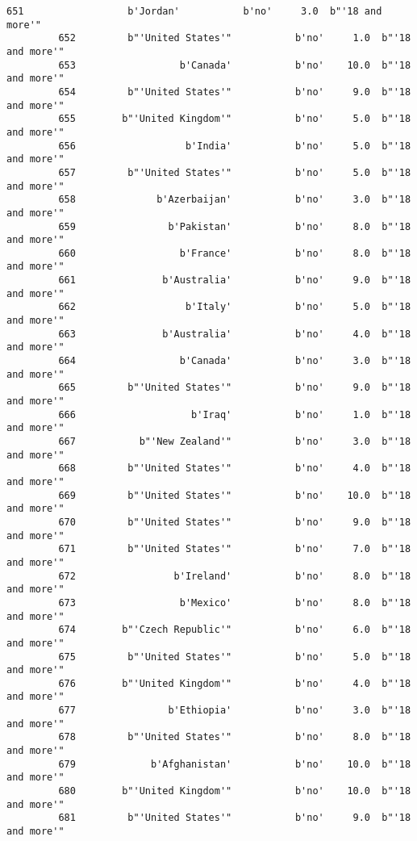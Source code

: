 \documentclass[11pt]{article}
\begin{document}
\begin{Verbatim}[commandchars=\\\{\}]
         651                  b'Jordan'           b'no'     3.0  b"'18 and more'"   
         652         b"'United States'"           b'no'     1.0  b"'18 and more'"   
         653                  b'Canada'           b'no'    10.0  b"'18 and more'"   
         654         b"'United States'"           b'no'     9.0  b"'18 and more'"   
         655        b"'United Kingdom'"           b'no'     5.0  b"'18 and more'"   
         656                   b'India'           b'no'     5.0  b"'18 and more'"   
         657         b"'United States'"           b'no'     5.0  b"'18 and more'"   
         658              b'Azerbaijan'           b'no'     3.0  b"'18 and more'"   
         659                b'Pakistan'           b'no'     8.0  b"'18 and more'"   
         660                  b'France'           b'no'     8.0  b"'18 and more'"   
         661               b'Australia'           b'no'     9.0  b"'18 and more'"   
         662                   b'Italy'           b'no'     5.0  b"'18 and more'"   
         663               b'Australia'           b'no'     4.0  b"'18 and more'"   
         664                  b'Canada'           b'no'     3.0  b"'18 and more'"   
         665         b"'United States'"           b'no'     9.0  b"'18 and more'"   
         666                    b'Iraq'           b'no'     1.0  b"'18 and more'"   
         667           b"'New Zealand'"           b'no'     3.0  b"'18 and more'"   
         668         b"'United States'"           b'no'     4.0  b"'18 and more'"   
         669         b"'United States'"           b'no'    10.0  b"'18 and more'"   
         670         b"'United States'"           b'no'     9.0  b"'18 and more'"   
         671         b"'United States'"           b'no'     7.0  b"'18 and more'"   
         672                 b'Ireland'           b'no'     8.0  b"'18 and more'"   
         673                  b'Mexico'           b'no'     8.0  b"'18 and more'"   
         674        b"'Czech Republic'"           b'no'     6.0  b"'18 and more'"   
         675         b"'United States'"           b'no'     5.0  b"'18 and more'"   
         676        b"'United Kingdom'"           b'no'     4.0  b"'18 and more'"   
         677                b'Ethiopia'           b'no'     3.0  b"'18 and more'"   
         678         b"'United States'"           b'no'     8.0  b"'18 and more'"   
         679             b'Afghanistan'           b'no'    10.0  b"'18 and more'"   
         680        b"'United Kingdom'"           b'no'    10.0  b"'18 and more'"   
         681         b"'United States'"           b'no'     9.0  b"'18 and more'"   

\end{Verbatim}
\end{document}
